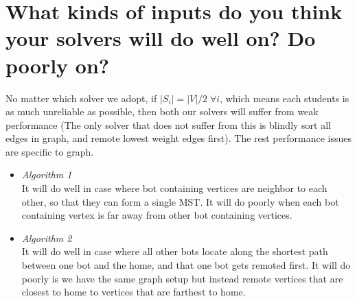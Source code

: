 \documentclass[10pt,a4paper]{article}
\begin{document}
\newpage
\section{What kinds of inputs do you think your solvers will do well on? Do poorly on?}
No matter which solver we adopt, if $|S_i| = |V|/2 \; \forall i$, which means each students is as much unreliable as possible, then both our solvers will suffer from weak performance (The only solver that does not suffer from this is blindly sort all edges in graph, and remote lowest weight edges first).
The rest performance issues are specific to graph.
\begin{itemize}
    \item \emph{Algorithm 1}\\
    It will do well in case where bot containing vertices are neighbor to each other, so that they can form a single MST. It will do poorly when each bot containing vertex is far away from other bot containing vertices. 
    \item \emph{Algorithm 2}\\
    It will do well in case where all other bots locate along the shortest path between one bot and the home, and that one bot gets remoted first. It will do poorly is we have the same graph setup but instead remote vertices that are closest to home to vertices that are farthest to home.
\end{itemize}
\end{document}

